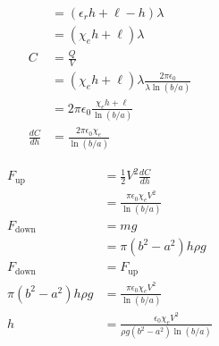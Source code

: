 \documentclass{article}
\begin{document}
\begin{align*}
                                                  & = (\epsilon_r h + \ell - h) \lambda                                      \\
                                                  & = (\chi_e h + \ell) \lambda                                              \\
  C                                               & = \frac{Q}{V}                                                            \\
                                                  & = (\chi_e h + \ell) \lambda \frac{2 \pi \epsilon_0}{\lambda \ln (b / a)} \\
                                                  & = 2 \pi \epsilon_0 \frac{\chi_e h + \ell}{\ln (b / a)}                   \\
  \frac{d C}{d h}                                 & = \frac{2 \pi \epsilon_0 \chi_e}{\ln (b / a)}
\end{align*}

\begin{align*}
  F_\text{up}              & = \frac{1}{2} V^2 \frac{d C}{d h}                              \\
                           & = \frac{\pi \epsilon_0 \chi_e V^2}{\ln (b / a)}                \\
  F_\text{down}            & = m g                                                          \\
                           & = \pi (b^2 - a^2) h \rho g                                     \\
  F_\text{down}            & = F_\text{up}                                                  \\
  \pi (b^2 - a^2) h \rho g & = \frac{\pi \epsilon_0 \chi_e V^2}{\ln (b / a)}                \\
  h                        & = \frac{\epsilon_0 \chi_e V^2}{\rho g (b^2 - a^2) \ln (b / a)}
\end{align*}

\subsection{}
\end{document}
